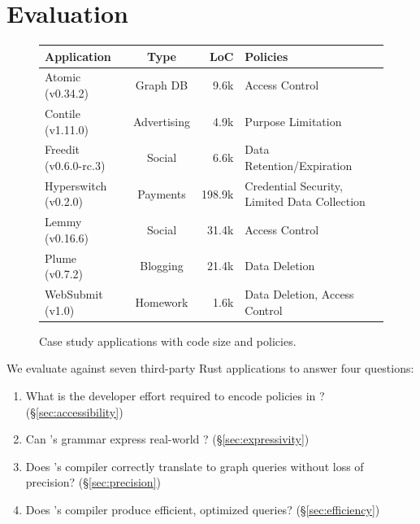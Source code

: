 \chapter{Evaluation}

\begin{figure}
    \centering
    \small
     \begin{tabular}{l|c|r|l}
       \bf Application        & \bf Type    & \bf LoC & \bf Policies   \\
      \hline
       Atomic~\cite{atomic} (v0.34.2)       & Graph DB    & 9.6k   & Access Control                                 \\
       Contile~\cite{contile} (v1.11.0)     & Advertising & 4.9k     & Purpose Limitation                           \\
       Freedit~\cite{freedit} (v0.6.0-rc.3) & Social      & 6.6k     & Data Retention/Expiration                     \\
       Hyperswitch~\cite{hyperswitch} (v0.2.0)   & Payments    & 198.9k     & Credential Security, Limited Data Collection  \\
       Lemmy~\cite{lemmy} (v0.16.6)        & Social      & 31.4k   & Access Control                               \\
       Plume~\cite{plume} (v0.7.2)         & Blogging    & 21.4k   & Data Deletion                                \\
       WebSubmit~\cite{websubmit} (v1.0)       & Homework    & 1.6k    & Data Deletion, Access Control     \\
    \end{tabular}
    \caption{Case study applications with code size and policies.}
    \label{f:apps}
   \end{figure}

We evaluate \syslang{} against seven third-party Rust applications to answer four questions:
%
\begin{enumerate}[nosep]
    \item What is the developer effort required to encode policies in \syslang? (\S\ref{sec:accessibility})
    \item Can \syslang's grammar express real-world \policies? (\S\ref{sec:expressivity})
    \item Does \syslang's compiler correctly translate \policies{} to graph queries without loss of precision? (\S\ref{sec:precision})
    \item Does \syslang's compiler produce efficient, optimized queries? (\S\ref{sec:efficiency})
\end{enumerate}
%

